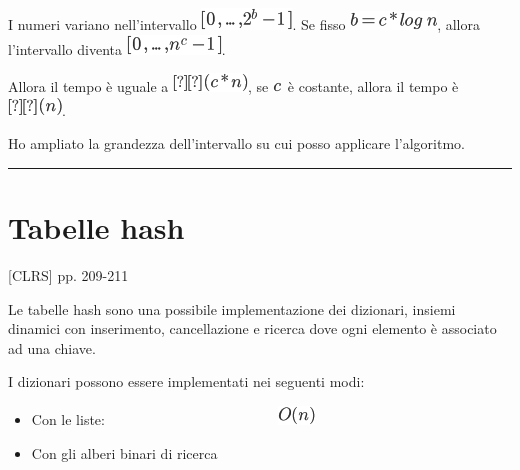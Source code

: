 \documentclass{article}
\providecommand{\tightlist}{%
  \setlength{\itemsep}{0pt}\setlength{\parskip}{0pt}}
\begin{document}
{I numeri variano nell'intervallo
}\includegraphics{images/image215.png}{. Se fisso
}\includegraphics{images/image216.png}{, allora l'intervallo diventa
}\includegraphics{images/image217.png}{.}

{Allora il tempo è uguale a }\includegraphics{images/image218.png}{, se
}\includegraphics{images/image219.png}{~è costante, allora il tempo è
}\includegraphics{images/image149.png}{.}

{}

{Ho ampliato la grandezza dell'intervallo su cui posso applicare
l'algoritmo.}

\begin{center}\rule{0.5\linewidth}{\linethickness}\end{center}

\section{\texorpdfstring{{}}{}}\label{h.nfzrbduhc0fl}

\hypertarget{h.1gvh3qlqsocy}{\section{\texorpdfstring{{Tabelle
hash}}{Tabelle hash}}\label{h.1gvh3qlqsocy}}

{{[}CLRS{]} pp. 209-211}

{}

{Le tabelle hash sono una possibile implementazione dei dizionari,
insiemi dinamici con inserimento, cancellazione e ricerca dove ogni
elemento è associato ad una chiave.}

{}

{I dizionari possono essere implementati nei seguenti modi:}

\begin{itemize}
\tightlist
\item
  {Con le liste:
  ~~~~~~~~~~~~~~~~~~~~~~~~}\includegraphics{images/image146.png}
\item
  {Con gli alberi binari di ricerca}
\end{itemize}
\end{document}
